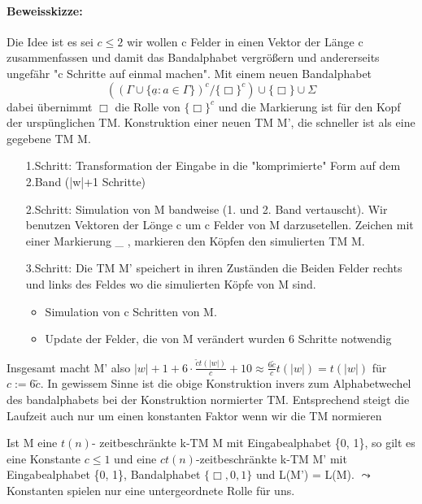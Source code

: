 \paragraph*{Beweisskizze:}    
    Die Idee ist es sei \(c \leq 2\) wir wollen c Felder in einen Vektor der Länge c zusammenfassen und damit das Bandalphabet vergrößern und andererseits ungefähr "c Schritte auf einmal machen".
    Mit einem neuen Bandalphabet 
    \[
        ((\Gamma \cup \{\underline{a}: a \in \Gamma\})^c/\{\Box\}^c) \cup \{\Box\} \cup \Sigma
    \]
    dabei übernimmt \(\Box\) die Rolle von \(\{\Box\}^c\) und die Markierung ist für den Kopf der urspünglichen TM. 
    \medskip
    Konstruktion einer neuen TM M', die schneller ist als eine gegebene TM M.
    \begin{itemize}
        \item [1.Schritt:] Transformation der Eingabe in die "komprimierte" Form auf dem 2.Band (|w|+1 Schritte)
        \item [2.Schritt:] Simulation von M bandweise (1. und 2. Band vertauscht). Wir benutzen Vektoren der Lönge c um c Felder von M darzusetellen. Zeichen mit einer Markierung \_ , markieren den Köpfen den simulierten TM M.
        \item [3.Schritt:] Die TM M' speichert in ihren Zuständen die Beiden Felder rechts und links des Feldes wo die simulierten Köpfe von M sind. 
        \begin{itemize}
            \item Simulation von c Schritten von M.
            \item Update der Felder, die von M verändert wurden 6 Schritte notwendig
        \end{itemize}
    \end{itemize}
    Insgesamt macht M' also \(|w|+ 1 + 6\cdot \frac{\tilde{c}t(|w|)}{c} + 10 \approx \frac{6\tilde{c}}{c} t(|w|) = t(|w|)\) für \(c := 6\tilde{c}\). 
    \medskip
    In gewissem Sinne ist die obige Konstruktion invers zum Alphabetwechel des bandalphabets bei der Konstruktion normierter TM. Entsprechend steigt die Laufzeit auch nur um einen konstanten Faktor wenn wir die TM normieren 

    Ist M eine \(t(n)\)- zeitbeschränkte k-TM M mit Eingabealphabet \{0, 1\}, so gilt es eine Konstante \(c \leq 1\) und eine \(ct(n)\)-zeitbeschränkte k-TM M' mit Eingabealphabet \{0, 1\}, Bandalphabet \(\{\Box, 0, 1\}\) und L(M') = L(M).
    \medskip
    \(\leadsto\) Konstanten spielen nur eine untergeordnete Rolle für uns.

